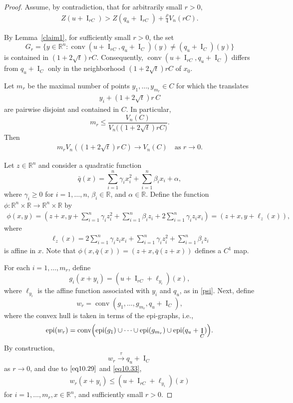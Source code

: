 \documentclass[11pt]{article}
\theoremstyle{definition} %
\DeclareMathOperator{\conv}{conv}
\DeclareMathOperator{\I}{I}
\DeclareMathOperator{\epi}{epi}
\newcommand{\seq}{\xrightarrow{\tau}}
\begin{document}
\begin{proof}
Assume, by contradiction, that for arbitrarily small $r>0$,
\begin{align}\label{eq10.28}
Z(u + \I_{rC})> Z(q_u+\I_{rC})+\frac{\rho}{4}V_n(rC).
\end{align}



By Lemma~\ref{claim1}, for sufficiently small $r>0$, the set
\[
G_r=\{y\in\mathbb{R}^n:\conv(u+\I_{rC},q_u+\I_C)(y)\neq(q_u+\I_C)(y)\}
\]
is contained in $(1+2\sqrt{t})rC$. Consequently,
$\conv(u+\I_{rC},q_u+\I_C)$ differs from $q_u+\I_C$ only in the neighborhood
$(1+2\sqrt{t})rC$ of $x_0$.





Let $m_r$ be the maximal number of points $y_1,\dots,y_{m_r}\in C$ for which the translates
\begin{align}\label{eq10.33}
  y_i+(1+2\sqrt{t})r\,C
\end{align}
are pairwise disjoint and contained in $C$. In particular,
$$
m_r \le \frac{V_n(C)}{V_n\big((1+2\sqrt{t})rC\big)}.
$$
Then
\begin{align}\label{eq10.34}
   m_rV_n((1+2\sqrt{t})r\, C)\rightarrow V_n(C) \quad \text{as } r\rightarrow 0.
\end{align}
 
Let $z\in\mathbb{R}^n$  and consider a quadratic function 
$$
\bar{q}(x) = \sum_{i=1}^n \gamma_i x_i^2 + \sum_{i=1}^n \beta_i x_i + \alpha,
$$  
where $\gamma_i\geq 0$ for   $i = 1, \dots, n$, $\beta_i \in \mathbb{R}$, and $\alpha \in \mathbb{R}$.  Define the function $\phi:\mathbb{R}^n\times\mathbb{R}\rightarrow \mathbb{R}^n\times\mathbb{R}$  by
\begin{align}\label{affine}
  \phi(x,y) = (z+x, y+\sum_{i=1}^n\gamma_iz_i^2+\sum_{i=1}^n\beta_i z_i+2\sum_{i=1}^n\gamma_iz_ix_i) =(z+x,y+\ell_z(x)),
\end{align}
where 
\begin{align}\label{psi}
 \ell_z(x)= 2\sum_{i=1}^n\gamma_iz_ix_i +\sum_{i=1}^n\gamma_iz_i^2+\sum_{i=1}^n\beta_i z_i   
\end{align} 
is  affine in $x$. Note that $\phi(x,\bar{q}(x))=(z+x,\bar{q}(z+x))$ defines a $C^1$ map.




For each $i = 1, \dots, m_r$, define
$$g_i(x+y_i)=(u + \I_{rC}+ \ell_{y_i})(x),$$
where $\ell_{y_i}$ is the affine function associated with $y_i$ and $q_u$, as in \eqref{psi}.  Next, define
$$w_r=\conv(g_1, \dots, g_{m_r},q_u+\I_C),$$
where the convex hull is taken in terms of the epi-graphs, i.e.,
$$
\epi(w_r) = \conv\Bigl(\epi(g_1) \cup \dots \cup \epi(g_{m_r}) \cup \epi(q_u + \I_C)\Bigr).
$$ 
By construction, 
$$w_r\seq q_u+\I_{C}$$
as $r\rightarrow 0$, and  due to $\eqref{eq10.29}$ and \eqref{eq10.33},  
\begin{align}\label{eq10.35}
w_r(x+y_i)\leq (u + \I_{rC}+\ell_{y_i})(x)
\end{align}
 for $i=1,\dots, m_r, x\in\mathbb{R}^n$, and  sufficiently small $r>0$. 
 

\end{proof}
\end{document}
